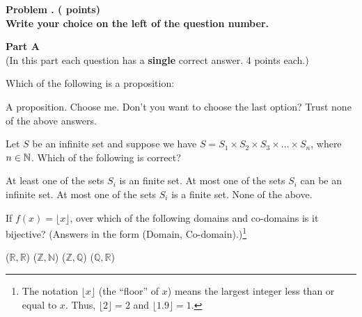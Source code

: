 

\newpage

\addtocounter{problemctr}{1}

{\bf
Problem \theproblemctr.  (\thechoices\xspace points)}
\\

{\bf Write your choice on the left of the question number.}


\begin{center}
{\bf Part A}\\
\medskip
(In this part each question has a {\bf single} correct answer. 4 points each.)
\end{center}
\bigskip

\begin{questions}

\question Which of the following is a proposition:
\begin{choices}
\choice A proposition.
\choice Choose me.
\choice Don't you want to choose the last option?
\choice {}
\choice Trust none of the above answers.
\end{choices}

\vspace{1.8in}

\question Let $S$ be an infinite set and suppose we have $S=S_1\times S_2 \times S_3\times \dots \times S_n$, where $n\in {\mathbb N}{}$. Which of the following is correct?
\begin{choices}
\choice {}
\choice At least one of the sets $S_i$ is an finite set.
\choice At most one of the sets $S_i$ can be an infinite set.
\choice At most one of the sets $S_i$ is a finite set.
\choice None of the above.
\end{choices}


\newpage

\question If $f(x) = \lfloor x \rfloor$, over which of the following
domains and co-domains is it bijective? (Answers in the form (Domain,
Co-domain).)\footnote{The notation $\lfloor x\rfloor$ (the ``floor''
  of $x$) means the largest integer less than or equal to $x$.  Thus,
  $\lfloor 2\rfloor=2$ and $\lfloor 1.9\rfloor=1$.}
\begin{choices}
\choice ($\mathbb{R}, \mathbb{R}$) 
\choice ($\mathbb{Z}, \mathbb{N}$) 
\choice {}
\choice ($\mathbb{Z}, \mathbb{Q}$) 
\choice ($\mathbb{Q}, \mathbb{R}$) 
\end{choices}


\end{questions}
